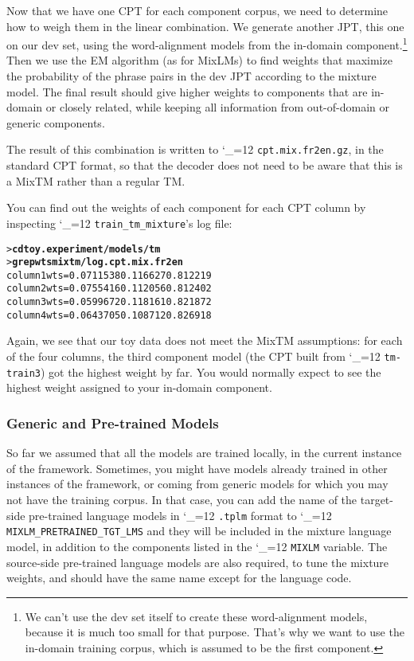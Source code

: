 \documentclass[11pt,letterpaper]{article}
\newcommand{\TODO}[1]{\emph{\textbf{\textcolor{red}{<TODO> #1 </TODO>}}}}
\def\code{\begingroup\catcode`\_=12 \codex}
\newcommand{\codex}[1]{\texttt{#1}\endgroup}
\begin{document}
Now that we have one CPT for each component corpus, we need to determine how to
weigh them in the linear combination.  We generate another JPT, this one on our
dev set, using the word-alignment models from the in-domain
component.\footnote{We can't use the dev set itself to create these
word-alignment models, because it is much too small for that purpose.  That's
why we want to use the in-domain training corpus, which is assumed to be the
first component.}  Then we use the EM
algorithm (as for MixLMs) to find weights that maximize the probability of the
phrase pairs in the dev JPT according to the mixture model.  The final result
should give higher weights to components that are in-domain or closely related,
while keeping all information from out-of-domain or generic components.

The result of this combination is written to \code{cpt.mix.fr2en.gz}, in
the standard CPT format, so that the decoder does not need to be aware that
this is a MixTM rather than a regular TM.

You can find out the weights of each component for each CPT column by
inspecting \code{train_tm_mixture}'s log file:
\begin{small}
\begin{alltt}
   > \textbf{cd toy.experiment/models/tm}
   > \textbf{grep wts mixtm/log.cpt.mix.fr2en}
   column 1 wts = 0.0711538 0.116627 0.812219
   column 2 wts = 0.0755416 0.112056 0.812402
   column 3 wts = 0.0599672 0.118161 0.821872
   column 4 wts = 0.0643705 0.108712 0.826918
\end{alltt}
\end{small}

Again, we see that our toy data does not meet the MixTM assumptions: for each
of the four columns, the third component model (the CPT built from
\code{tm-train3}) got the highest weight by far. You would normally expect to
see the highest weight assigned to your in-domain component.

\subsubsection{Generic and Pre-trained Models} \label{Generic}


So far we assumed that all the models are trained locally, in the current
instance of the framework.  Sometimes, you might have models already trained in
other instances of the framework, or coming from generic models for which you
may not have the training corpus.  In that case, you can add the name of the
target-side pre-trained language models in \code{.tplm} format to
\code{MIXLM_PRETRAINED_TGT_LMS} and they will be included in the mixture
language model, in addition to the components listed in the \code{MIXLM}
variable.  The source-side pre-trained language models are also required,
to tune the mixture weights, and should have the same name except for the
language code.
\end{document}

